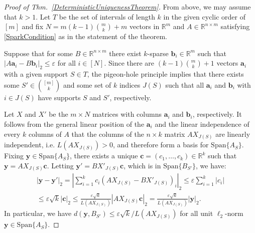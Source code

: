 \documentclass[journal, twocolumn]{IEEEtran}
\begin{document}
\begin{proof}[Proof of Thm.~\ref{DeterministicUniquenessTheorem}]
From above, we may assume that $k > 1$. Let $T$ be the set of intervals of length $k$ in the given cyclic order of $[m]$ and fix $N = m(k-1){m \choose k}+m$ vectors in $\mathbb{R}^m$ and $A \in \mathbb{R}^{n \times m}$ satisfying \eqref{SparkCondition} as in the statement of the theorem. %

Suppose that for some $B \in \mathbb{R}^{n \times m}$ there exist $k$-sparse \mbox{$\mathbf{b}_i \in \mathbb{R}^m$} such that $|A\mathbf{a}_i - B\mathbf{b}_i|_2 \leq \varepsilon$ for all $i \in [N]$. Since there are $(k-1){m \choose k}+1$ vectors $\mathbf{a}_i$ with a given support $S \in T$, the pigeon-hole principle implies that there exists some $S' \in {[m] \choose k}$ and some set of $k$ indices $J(S)$ such that all $\mathbf{a}_i$ and $\mathbf{b}_i$ with $i \in J(S)$ have supports $S$ and $S'$, respectively.

Let $X$ and $X'$ be the $m \times N$ matrices with columns $\mathbf{a}_i$ and $\mathbf{b}_i$, respectively. It follows from the general linear position of the $\mathbf{a}_i$ and the linear independence of every $k$ columns of $A$ that the columns of the $n \times k$ matrix $AX_{J(S)}$ are linearly independent, i.e. $L(AX_{J(S)}) > 0$, and therefore form a basis for $\text{Span}\{A_{S}\}$. Fixing $\mathbf{y} \in \text{Span}\{A_{S}\}$, there exists a unique $\mathbf{c} = (c_1, \ldots, c_k) \in \mathbb{R}^k$ such that $\mathbf{y} = AX_{J(S)}\mathbf{c}$. Letting \mbox{$\mathbf{y'} = BX'_{J(S)}\mathbf{c}$}, which is in $\text{Span}\{B_{S'}\}$, we have:
\begin{align*}
|\mathbf{y} - \mathbf{y'}|_2 
= |\sum_{i=1}^k c_i(AX_{J(S)} - BX'_{J(S)})_i|_2 
\leq \varepsilon \sum_{i=1}^k |c_i| \\
\leq \varepsilon \sqrt{k}  |\mathbf{c}|_2 
\leq \frac{\varepsilon \sqrt{k}}{L(AX_{J(S)})} |AX_{J(S)}\mathbf{c}|_2 
= \frac{\varepsilon \sqrt{k}}{L(AX_{J(S)})} |\mathbf{y}|_2.
\end{align*}
In particular, we have $d(\mathbf{y}, B_{S'}) \leq \varepsilon\sqrt{k} / L(AX_{J(S)})$ for all unit $\ell_2$-norm $\mathbf{y} \in \text{Span}\{A_{S}\}$.


\end{proof}
\end{document}
